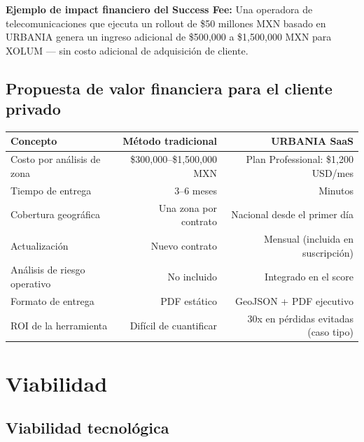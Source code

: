\documentclass[12pt,a4paper]{article}
\begin{document}
\begin{tagline}
\textbf{Ejemplo de impact financiero del Success Fee:} Una operadora de telecomunicaciones que ejecuta un rollout de \$50 millones MXN basado en URBANIA genera un ingreso adicional de \$500{,}000 a \$1{,}500{,}000 MXN para XOLUM — sin costo adicional de adquisición de cliente.
\end{tagline}

\subsection{Propuesta de valor financiera para el cliente privado}

\begin{table}[H]
\centering
\small
\renewcommand{\arraystretch}{1.3}
\begin{tabularx}{\textwidth}{X r r}
\toprule
\rowcolor{grisoscuro}
\color{white}\textbf{Concepto} & \color{white}\textbf{Método tradicional} & \color{white}\textbf{URBANIA SaaS} \\
\midrule
Costo por análisis de zona & \$300{,}000–\$1{,}500{,}000 MXN & Plan Professional: \$1{,}200 USD/mes \\
\rowcolor{fondofila}
Tiempo de entrega & 3–6 meses & Minutos \\
Cobertura geográfica & Una zona por contrato & Nacional desde el primer día \\
\rowcolor{fondofila}
Actualización & Nuevo contrato & Mensual (incluida en suscripción) \\
Análisis de riesgo operativo & No incluido & Integrado en el score \\
\rowcolor{fondofila}
Formato de entrega & PDF estático & GeoJSON + PDF ejecutivo \\
ROI de la herramienta & Difícil de cuantificar & 30x en pérdidas evitadas (caso tipo) \\
\bottomrule
\end{tabularx}
\end{table}


\newpage
\section{Viabilidad}

\subsection{Viabilidad tecnológica}
\end{document}
